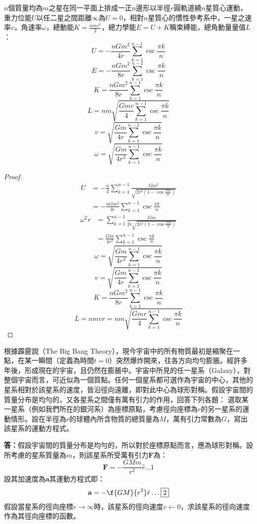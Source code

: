 \documentclass[a4paper,12pt]{article}
\begin{document}
$n$個質量均為$m$之星在同一平面上排成一正$n$邊形以半徑$r$圓軌道繞$n$星質心運動，重力位能$U$以任二星之間距離$\infty$為$U=0$，相對$n$星質心的慣性參考系中，一星之速率$v$，角速率$\omega$，總動能$K=\frac{nmv^2}{2}$，總力學能$E=U+K$稱束縛能，總角動量量值$L$：
\[U=-\frac{nGm^2}{4r}\sum_{k=1}^{n-1}\csc\frac{\pi k}{n}\]
\[E=-\frac{nGm^2}{8r}\sum_{k=1}^{n-1}\csc\frac{\pi k}{n}\]
\[K=\frac{nGm^2}{8r}\sum_{k=1}^{n-1}\csc\frac{\pi k}{n}\]
\[L=nm\sqrt{\frac{Gmr}{4}\sum_{k=1}^{n-1}\csc\frac{\pi k}{n}}\]
\[v=\sqrt{\frac{Gm}{4r}\sum_{k=1}^{n-1}\csc\frac{\pi k}{n}}\]
\[\omega=\sqrt{\frac{Gm}{4r^3}\sum_{k=1}^{n-1}\csc\frac{\pi k}{n}}\]
\begin{proof}
\[\begin{aligned}
U&=-\frac{n}{2}\sum_{k=1}^{n-1}\frac{Gm^2}{\sqrt{2r^2\left(1-\cos\frac{2\pi k}{n}\right)}}\\
&=-\frac{nGm^2}{4r}\sum_{k=1}^{n-1}\csc\frac{\pi k}{n}
\end{aligned}\]
\[\begin{aligned}
\omega^2r&=\sum_{k=1}^{n-1}\frac{Gm}{2r\sqrt{2r^2\left(1-\cos\frac{2\pi k}{n}\right)}}\\
&=\frac{Gm}{4r^2}\sum_{k=1}^{n-1}\csc\frac{\pi k}{n}
\end{aligned}\]
\[\omega=\sqrt{\frac{Gm}{4r^3}\sum_{k=1}^{n-1}\csc\frac{\pi k}{n}}\]
\[v=\sqrt{\frac{Gm}{4r}\sum_{k=1}^{n-1}\csc\frac{\pi k}{n}}\]
\[K=\frac{nGm^2}{8r}\sum_{k=1}^{n-1}\csc\frac{\pi k}{n}\]
\[L=nmvr=nm\sqrt{\frac{Gmr}{4}\sum_{k=1}^{n-1}\csc\frac{\pi k}{n}}\]
\end{proof}
根據霹靂說（The Big Bang Theory），現今宇宙中的所有物質最初是縮聚在一點，在某一瞬間（定義為時間$t=0$）突然爆炸開來，往各方向均勻膨脹。經許多年後，形成現在的宇宙，且仍然在膨脹中。宇宙中所見的任一星系（Galaxy），對整個宇宙而言，可近似為一個質點。任何一個星系都可選作為宇宙的中心，其他的星系相對於該星系的速度，皆沿徑向遠離，即對此中心為球形對稱。假設宇宙間的質量分布是均勻的，又各星系之間僅有萬有引力的作用，回答下列各題：
選取某一星系（例如我們所在的銀河系）為座標原點，考慮徑向座標為$r$的另一星系的運動情形。設在半徑為$r$的球體內所含物質的總質量為$M$，萬有引力常數為$G$，寫出該星系的運動方程式。 

\textbf{答：}假設宇宙間的質量分布是均勻的，所以對於座標原點而言，應為球形對稱。設所考慮的星系質量為$m$，則該星系所受萬有引力$\mathbf{F}$為：
\[\mathbf{F}=-\frac{GMm}{r^2}\hat{r}\ldots\boxed{1}\]
設其加速度為$\mathbf{a}$其運動方程式即：
\[\mathbf{a}=-\f{GM}{r^2}\hat{r}\ldots\boxed{2}\]
假設當星系的徑向座標$r\to\infty$時，該星系的徑向速度$v\leftarrow 0$，求該星系的徑向速度作為其徑向座標的函數。 
\end{document}
